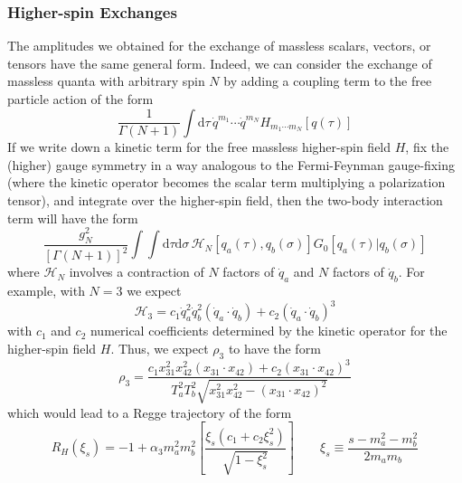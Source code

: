 \subsubsection*{Higher-spin Exchanges}
The amplitudes we obtained for the exchange of massless scalars, vectors, or tensors have the same general form. Indeed, we can consider the exchange of massless quanta with arbitrary spin $N$ by adding a coupling term to the free particle action of the form
\begin{equation}
	\frac{1}{\Gamma(N + 1)} \int \mathrm{d}\tau \, \dot{q}^{m_{1}} \cdots \dot{q}^{m_{N}} H_{m_{1} \cdots m_{N}}[q(\tau)]
\end{equation}
If we write down a kinetic term for the free massless higher-spin field $H$, fix the (higher) gauge symmetry in a way analogous to the Fermi-Feynman gauge-fixing (where the kinetic operator becomes the scalar term multiplying a polarization tensor), and integrate over the higher-spin field, then the two-body interaction term will have the form
\begin{equation}
 	\frac{g_{N}^{2}}{[\Gamma(N+1)]^{2}} \int \int \mathrm{d}\tau \mathrm{d}\sigma \, \mathcal{H}_{N}[q_{a}(\tau), q_{b}(\sigma)] G_{0}[q_{a}(\tau) | q_{b}(\sigma)]
\end{equation}
where $\mathcal{H}_{N}$ involves a contraction of $N$ factors of $\dot{q}_{a}$ and $N$ factors of $\dot{q}_{b}$. For example, with $N = 3$ we expect
\begin{equation}
	\mathcal{H}_{3} = c_{1} \dot{q}_{a}^{2} \dot{q}_{b}^{2} (\dot{q}_{a} \cdot \dot{q}_{b}) + c_{2} (\dot{q}_{a} \cdot \dot{q}_{b})^{3}
\end{equation}
with $c_{1}$ and $c_{2}$ numerical coefficients determined by the kinetic operator for the higher-spin field $H$. Thus, we expect $\rho_{3}$ to have the form
\begin{equation}
	\rho_{3} = \frac{c_{1} x_{31}^{2} x_{42}^{2} (x_{31} \cdot x_{42}) + c_{2} (x_{31} \cdot x_{42})^{3}}{T_{a}^{2} T_{b}^{2} \sqrt{x_{31}^{2} x_{42}^{2} - (x_{31} \cdot x_{42})^{2}} }
\end{equation}
which would lead to a Regge trajectory of the form
\begin{equation}
	R_{H}(\xi_{s}) = -1 + \alpha_{3} m_{a}^{2} m_{b}^{2} \left[ \frac{\xi_{s}(c_{1} + c_{2} \xi^{2}_{s})}{\sqrt{1 - \xi^{2}_{s}}} \right] \qquad \xi_{s} \equiv \frac{s - m_{a}^{2} - m_{b}^{2}}{2 m_{a} m_{b}}
\end{equation}
